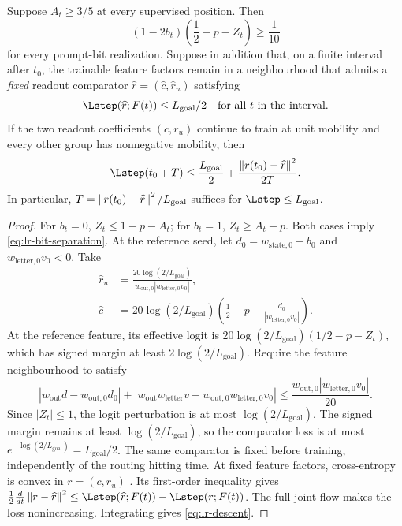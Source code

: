 \begin{lemma}
\label{lem:lr-readout-convergence}
Suppose $A_t\ge3/5$ at every supervised position.  Then
\begin{equation}\label{eq:lr-bit-separation}
 (1-2b_t)\left(\frac12-p-Z_t\right)\ge\frac1{10}
\end{equation}
for every prompt-bit realization.  Suppose in addition that, on a
finite interval after $t_0$, the trainable feature factors remain in a
neighbourhood that admits a \emph{fixed} readout comparator
$\widehat r=(\widehat c,\widehat r_u)$ satisfying
\begin{equation}\label{eq:lr-comparator}
 \Lstep(\widehat r;F(t))\le L_{\mathrm{goal}}/2
 \quad\text{for all }t\text{ in the interval}.
\end{equation}
If the two readout coefficients $(c,r_u)$ continue to train at unit
mobility and every other group has nonnegative mobility, then
\begin{equation}\label{eq:lr-descent}
 \Lstep(t_0+T)\le\frac{L_{\mathrm{goal}}}{2}+
 \frac{\LRnorm{r(t_0)-\widehat r}^2}{2T}.
\end{equation}
In particular, $T=\left\lVert r(t_0)-\widehat r\right\rVert^2/L_{\mathrm{goal}}$ suffices for
$\Lstep\le L_{\mathrm{goal}}$.
\end{lemma}
\begin{proof}
For $b_t=0$, $Z_t\le1-p-A_t$; for $b_t=1$,
$Z_t\ge A_t-p$.  Both cases imply
\eqref{eq:lr-bit-separation}.
At the reference seed, let $d_0=w_{\mathrm{state},0}+b_0$ and $w_{\mathrm{letter},0}v_0<0$. Take
\[
 \begin{aligned}
 \widehat r_u&=\frac{20\log(2/L_{\mathrm{goal}})}{w_{\mathrm{out},0}|w_{\mathrm{letter},0}v_0|},\\
 \widehat c&=20\log(2/L_{\mathrm{goal}})\left(\frac12-p-\frac{d_0}{|w_{\mathrm{letter},0}v_0|}\right).
 \end{aligned}
\] 
At the reference feature, its effective logit is
$20\log(2/L_{\mathrm{goal}})(1/2-p-Z_t)$, which has signed margin at least $2\log(2/L_{\mathrm{goal}})$.
Require the feature neighbourhood to satisfy
\begin{equation}\label{eq:lr-comparator-stability}
 |w_{\mathrm{out}} d-w_{\mathrm{out},0}d_0|+|w_{\mathrm{out}} {w_{\mathrm{letter}} v}-w_{\mathrm{out},0}{w_{\mathrm{letter},0}v_0}|
 \le\frac{w_{\mathrm{out},0}|{w_{\mathrm{letter},0}v_0}|}{20}.
\end{equation}
Since $|Z_t|\le1$, the logit perturbation is at most $\log(2/L_{\mathrm{goal}})$.
The signed margin remains at least $\log(2/L_{\mathrm{goal}})$, so the comparator loss is
at most $e^{-\log(2/L_{\mathrm{goal}})}=L_{\mathrm{goal}}/2$. The same comparator is fixed before training,
independently of the routing hitting time.
At fixed feature factors, cross-entropy is convex in $r=(c,r_u)$ \citep[Section~3.1.5]{boyd2004convex}. Its first-order inequality \citep[Section~3.1.3]{boyd2004convex} gives
$\frac12\frac{d}{dt}\LRnorm{r-\widehat r}^2
\le\Lstep(\widehat r;F(t))-\Lstep(r;F(t))$.
The full joint flow makes the loss nonincreasing.  Integrating gives
\eqref{eq:lr-descent}.
\end{proof}

